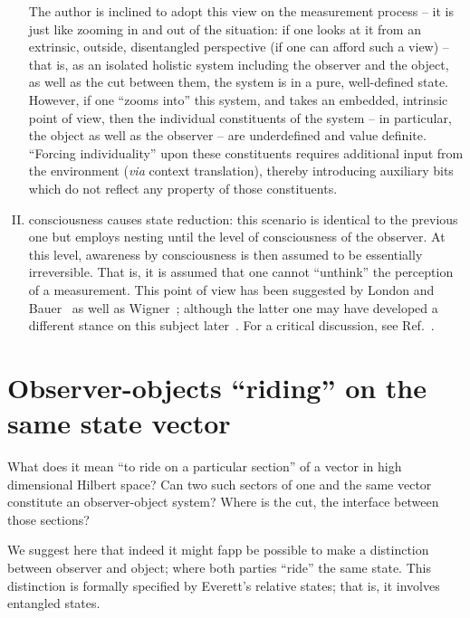 \begin{enumerate}[(I)]
The author is inclined to adopt this view on the measurement process -- it is just like zooming in and out of the situation:
if one looks at it
from an extrinsic, outside, disentangled perspective (if one can afford such a view) -- that is, as an isolated holistic system including the observer and the object,
as well as the cut between them,
the system is in a pure, well-defined state.
However, if one ``zooms into'' this system, and takes an embedded, intrinsic point of view, then the individual constituents of the system
-- in particular, the object as well as the observer -- are underdefined and value definite.
``Forcing individuality'' upon these constituents requires additional input from the environment ({\it via} context translation),
thereby introducing auxiliary bits which do not reflect any property of those constituents.

\item
consciousness causes state reduction:
this scenario is identical to the previous one but employs nesting until the level of consciousness of the observer.
At this level, awareness by consciousness is then assumed to be essentially irreversible. That is, it is assumed that one cannot ``unthink''
the perception of a measurement.
This point of view has been suggested by London and Bauer~\cite{london-Bauer-1939,london-Bauer-1983} as well as Wigner~\cite{wigner:mb};
although the latter one may have developed a different stance on this subject later~\cite{Esfeld-1999}.
For a critical discussion, see Ref.~\cite{Yu-Nikoli-2011}.
\end{enumerate}



\section{Observer-objects ``riding'' on the same state vector}

What does it mean ``to ride on a particular section'' of a vector in high dimensional Hilbert space?
Can two such sectors of one and the same vector
constitute an observer-object system?
Where is the cut, the interface between those sections?

We suggest here that indeed it might fapp be possible to make a distinction between observer and object; where both parties ``ride'' the same state.
This distinction is formally specified by Everett's relative states; that is, it involves entangled states.









